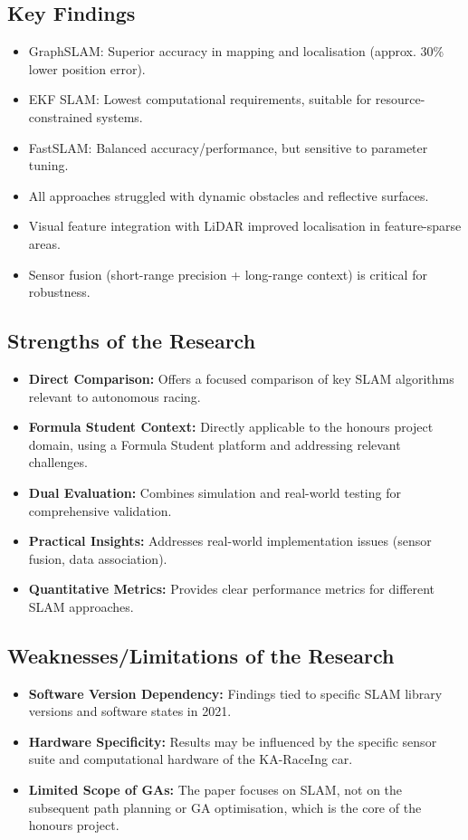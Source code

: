 \subsection{Key Findings}\label{subsec:key-findings}
\begin{itemize}
    \item GraphSLAM: Superior accuracy in mapping and localisation (approx. 30\% lower position error).
    \item EKF SLAM: Lowest computational requirements, suitable for resource-constrained systems.
    \item FastSLAM: Balanced accuracy/performance, but sensitive to parameter tuning.
    \item All approaches struggled with dynamic obstacles and reflective surfaces.
    \item Visual feature integration with LiDAR improved localisation in feature-sparse areas.
    \item Sensor fusion (short-range precision + long-range context) is critical for robustness.
\end{itemize}

\subsection{Strengths of the Research}\label{subsec:strengths-of-the-research2}
\begin{itemize}
    \item \textbf{Direct Comparison:} Offers a focused comparison of key SLAM algorithms relevant to autonomous racing.
    \item \textbf{Formula Student Context:} Directly applicable to the honours project domain, using a Formula Student platform and addressing relevant challenges.
    \item \textbf{Dual Evaluation:} Combines simulation and real-world testing for comprehensive validation.
    \item \textbf{Practical Insights:} Addresses real-world implementation issues (sensor fusion, data association).
    \item \textbf{Quantitative Metrics:} Provides clear performance metrics for different SLAM approaches.
\end{itemize}

\subsection{Weaknesses/Limitations of the Research}\label{subsec:weaknesses/limitations-of-the-research2}
\begin{itemize}
    \item \textbf{Software Version Dependency:} Findings tied to specific SLAM library versions and software states in 2021.
    \item \textbf{Hardware Specificity:} Results may be influenced by the specific sensor suite and computational hardware of the KA-RaceIng car.
    \item \textbf{Limited Scope of GAs:} The paper focuses on SLAM, not on the subsequent path planning or GA optimisation, which is the core of the honours project.
\end{itemize}

